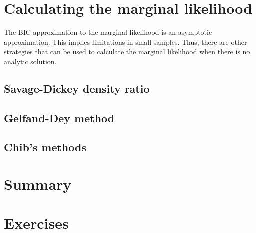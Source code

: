 
\section{Calculating the marginal likelihood}\label{sec10_6}

The BIC approximation to the marginal likelihood is an asymptotic approximation. This implies limitations in small samples. Thus, there are other strategies that can be used to calculate the marginal likelihood when there is no analytic solution.

\subsection{Savage-Dickey density ratio}\label{sec10_11}

\subsection{Gelfand-Dey method}\label{sec10_12}

\subsection{Chib's methods}\label{sec10_13}

\section{Summary}\label{sec10_7}

\section{Exercises}\label{sec10_8}

